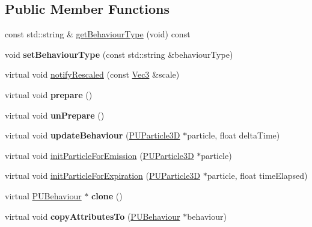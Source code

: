 \subsection*{Public Member Functions}
\begin{DoxyCompactItemize}
\item 
const std\+::string \& \hyperlink{classPUBehaviour_a9874198e06f7c5a2682f9811a2811b36}{get\+Behaviour\+Type} (void) const
\item 
\mbox{\label{classPUBehaviour_aa5771166179f007006827b90ed65f28d}} 
void {\bfseries set\+Behaviour\+Type} (const std\+::string \&behaviour\+Type)
\item 
virtual void \hyperlink{classPUBehaviour_ae2544d7f4a7a98e06c5ea9cedd1085ab}{notify\+Rescaled} (const \hyperlink{classVec3}{Vec3} \&scale)
\item 
\mbox{\label{classPUBehaviour_a19d5cf43adb034e0b6d4a64f030175b5}} 
virtual void {\bfseries prepare} ()
\item 
\mbox{\label{classPUBehaviour_aa60e0077f8c3c676a3a71be761f57c7f}} 
virtual void {\bfseries un\+Prepare} ()
\item 
\mbox{\label{classPUBehaviour_a4c34510be594383c9eff8f941d0372f0}} 
virtual void {\bfseries update\+Behaviour} (\hyperlink{structPUParticle3D}{P\+U\+Particle3D} $\ast$particle, float delta\+Time)
\item 
virtual void \hyperlink{classPUBehaviour_a308feeef3a8e8f394c47a41c8c5ca437}{init\+Particle\+For\+Emission} (\hyperlink{structPUParticle3D}{P\+U\+Particle3D} $\ast$particle)
\item 
virtual void \hyperlink{classPUBehaviour_a617f6ffd347e4ac810b5afa9aee1fc04}{init\+Particle\+For\+Expiration} (\hyperlink{structPUParticle3D}{P\+U\+Particle3D} $\ast$particle, float time\+Elapsed)
\item 
\mbox{\label{classPUBehaviour_a0d74efa603df6e0ecd1192470d2ec3ae}} 
virtual \hyperlink{classPUBehaviour}{P\+U\+Behaviour} $\ast$ {\bfseries clone} ()
\item 
\mbox{\label{classPUBehaviour_a6ca41b71bd8c0deda460258d52fc7721}} 
virtual void {\bfseries copy\+Attributes\+To} (\hyperlink{classPUBehaviour}{P\+U\+Behaviour} $\ast$behaviour)

\end{DoxyCompactItemize}
